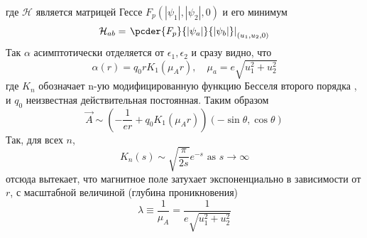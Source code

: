 где \( \mathcal{H} \) является матрицей Гессе \( F_p(|\psi_1|, |\psi_2|, 0) \) 
и его минимум
\begin{equation}
    \mathcal{H}_{ab} = \left. \pcder{F_p}{|\psi_a|}{|\psi_b|} 
        \right|_{(u_1, u_2, 0)}
    \label{eq:12}
\end{equation}
Так \( \alpha \) асимптотически отделяется от \( \epsilon_1, \epsilon_2\) и 
сразу видно, что
\begin{equation}
    \alpha(r) = q_0 r K_1(\mu_A r), \quad
    \mu_a = e\sqrt{u_1^2 + u_2^2}
    \label{eq:13}
\end{equation}
где \( K_n \) обозначает n-ую модифицированную функцию Бесселя второго порядка 
\cite{bib:23}, и \( q_0 \) неизвестная действительная постоянная. Таким образом
\begin{equation}
    \vec{A} \sim \left( -\frac{1}{er} + q_0 K_1(\mu_A r) \right)
        (-\sin\theta, \cos\theta)
    \label{eq:14}
\end{equation}
Так, для всех \( n \), 
\begin{equation}
    K_n(s) \sim \sqrt{\frac{\pi}{2s}}e^{-s} \text{ as } s \rightarrow \infty
    \label{eq:15}
\end{equation}
отсюда вытекает, что магнитное поле затухает экспоненциально в зависимости от 
\( r \), с масштабной величиной (глубина проникновения)
\begin{equation}
    \lambda \equiv \frac{1}{\mu_A} = \frac{1}{e\sqrt{u_1^2 + u_2^2}}
    \label{eq:16}
\end{equation}

